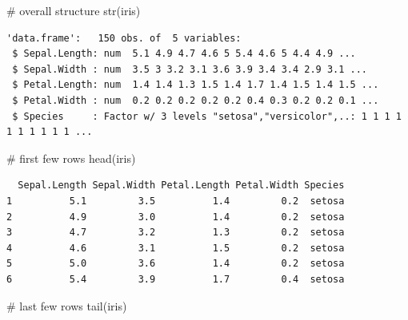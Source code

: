 \documentclass[
  letterpaper,
  DIV=11,
  numbers=noendperiod]{scrreprt}
\newenvironment{Shaded}{\begin{snugshade}}{\end{snugshade}}
\newcommand{\CommentTok}[1]{\textcolor[rgb]{0.37,0.37,0.37}{#1}}
\newcommand{\FunctionTok}[1]{\textcolor[rgb]{0.28,0.35,0.67}{#1}}
\newcommand{\NormalTok}[1]{\textcolor[rgb]{0.00,0.23,0.31}{#1}}
\begin{document}
\begin{tcolorbox}[enhanced jigsaw, colbacktitle=quarto-callout-tip-color!10!white, opacitybacktitle=0.6, breakable, left=2mm, leftrule=.75mm, toprule=.15mm, toptitle=1mm, bottomtitle=1mm, colframe=quarto-callout-tip-color-frame, opacityback=0, coltitle=black, arc=.35mm, titlerule=0mm, colback=white, bottomrule=.15mm, title=\textcolor{quarto-callout-tip-color}{\faLightbulb}\hspace{0.5em}{Answer}, rightrule=.15mm]

\begin{Shaded}
\begin{Highlighting}[]
\CommentTok{\# overall structure}
\FunctionTok{str}\NormalTok{(iris)}
\end{Highlighting}
\end{Shaded}

\begin{verbatim}
'data.frame':   150 obs. of  5 variables:
 $ Sepal.Length: num  5.1 4.9 4.7 4.6 5 5.4 4.6 5 4.4 4.9 ...
 $ Sepal.Width : num  3.5 3 3.2 3.1 3.6 3.9 3.4 3.4 2.9 3.1 ...
 $ Petal.Length: num  1.4 1.4 1.3 1.5 1.4 1.7 1.4 1.5 1.4 1.5 ...
 $ Petal.Width : num  0.2 0.2 0.2 0.2 0.2 0.4 0.3 0.2 0.2 0.1 ...
 $ Species     : Factor w/ 3 levels "setosa","versicolor",..: 1 1 1 1 1 1 1 1 1 1 ...
\end{verbatim}

\begin{Shaded}
\begin{Highlighting}[]
\CommentTok{\# first few rows}
\FunctionTok{head}\NormalTok{(iris)}
\end{Highlighting}
\end{Shaded}

\begin{verbatim}
  Sepal.Length Sepal.Width Petal.Length Petal.Width Species
1          5.1         3.5          1.4         0.2  setosa
2          4.9         3.0          1.4         0.2  setosa
3          4.7         3.2          1.3         0.2  setosa
4          4.6         3.1          1.5         0.2  setosa
5          5.0         3.6          1.4         0.2  setosa
6          5.4         3.9          1.7         0.4  setosa
\end{verbatim}

\begin{Shaded}
\begin{Highlighting}[]
\CommentTok{\# last few rows}
\FunctionTok{tail}\NormalTok{(iris)}
\end{Highlighting}
\end{Shaded}


\end{tcolorbox}
\end{document}
